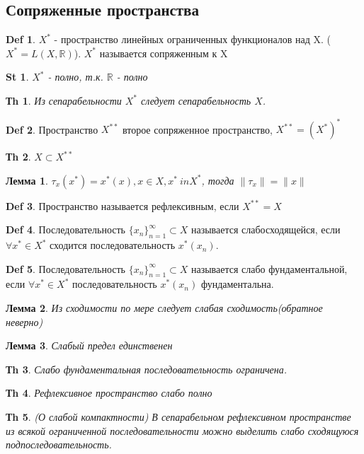 \documentclass[14pt]{article}
\theoremstyle{plain}
\newtheorem{Thm}{Тh}
\newtheorem{Lem}{Лемма}
\newtheorem{St}{St}
\theoremstyle{definition}
\newtheorem{Def}{Def}
\begin{document}
 	\subsection{Сопряженные пространства}
 		\begin{Def}
			$X^{*}$ - пространство линейных ограниченных функционалов над X. ($X^{*} = L(X, \mathbb{R})$). $X^{*}$ называется сопряженным к X
 		\end{Def}
 		\begin{St}
 			$X^{*}$ - полно, т.к. $\mathbb{R}$ - полно
 		\end{St}
 		\begin{Thm}
 			Из сепарабельности $X^{*}$ следует сепарабельность $X$. 
 		\end{Thm}
 		\begin{Def}
 			Пространство $X^{**}$ второе сопряженное пространство, $X^{**} = (X^{*})^{*}$ 
 		\end{Def}
 		\begin{Thm}
 			$X \subset X^{**}$
 		\end{Thm}
 		\begin{Lem}
 			$\tau_x(x^{*}) = x^{*}(x), x \in X, x^{*} \ in X^{*}$, тогда $\|\tau_x \| = \|x\|$
 		\end{Lem}
 		\begin{Def}
 			Пространство называется рефлексивным, если $X^{**} = X$
 		\end{Def}
 		\begin{Def}
 			Последовательность $\{x_n\}_{n=1}^{\infty} \subset X$ называется слабосходящейся, если $\forall x^{*} \in X^{*}$ сходится последовательность $x^{*}(x_n)$.
 		\end{Def}
 		\begin{Def}
 			Последовательность $\{x_n\}_{n=1}^{\infty} \subset X$ называется слабо фундаментальной, если $\forall x^{*} \in X^{*}$ последовательность $x^{*}(x_n)$ фундаментальна. 
 		\end{Def}
 		\begin{Lem}
 			Из сходимости по мере следует слабая сходимость(обратное неверно)
 		\end{Lem}
 		\begin{Lem}
 			Слабый предел единственен
 		\end{Lem}
 		\begin{Thm}
 			Слабо фундаментальная последовательность ограничена. 
 		\end{Thm}
 		\begin{Thm}
 			Рефлексивное пространство слабо полно
 		\end{Thm}
 		\begin{Thm}
 			(О слабой компактности)\newline
 			В сепарабельном рефлексивном пространстве из всякой ограниченной последовательности можно выделить слабо сходящуюся подпоследовательность. 
 		\end{Thm}
 	
\end{document}
